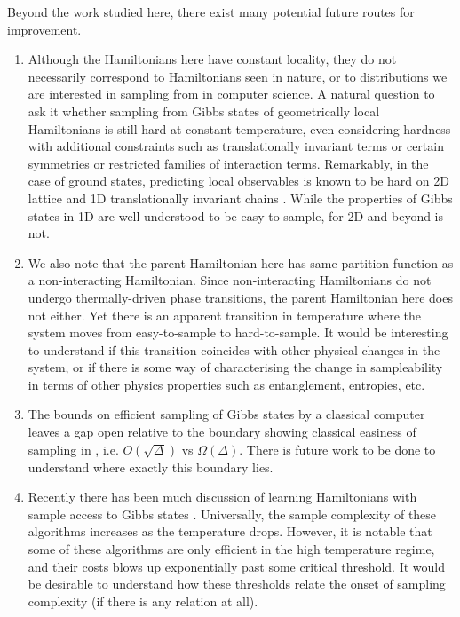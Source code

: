 \documentclass[a4paper,onecolumn,11pt,accepted=2017-05-09]{quantumarticle}
\begin{document}
Beyond the work studied here, there exist many potential future routes for improvement.
	\begin{enumerate}
 
	    \item 
	
	Although the Hamiltonians here have constant locality, they do not necessarily correspond to Hamiltonians seen in nature, or to distributions we are interested in sampling from in computer science. 
	A natural question to ask it whether sampling from Gibbs states of geometrically local Hamiltonians is still hard at constant temperature, even considering hardness with additional constraints such as translationally invariant terms or certain symmetries or restricted families of interaction terms.
	Remarkably, in the case of ground states, predicting local observables is known to be hard on 2D lattice and 1D translationally invariant chains \cite{gottesman2009quantum,gharibian2019oracle, watson2020complexity}.
    While the properties of Gibbs states in 1D are well understood to be easy-to-sample, for 2D and beyond is not.
	
	\item We also note that the parent Hamiltonian here has same partition function as a non-interacting Hamiltonian.
	Since non-interacting Hamiltonians do not undergo thermally-driven phase transitions, the parent Hamiltonian here does not either.
	Yet there is an apparent transition in temperature where the system moves from easy-to-sample to hard-to-sample.
	It would be interesting to understand if this transition coincides with other physical changes in the system, or if there is some way of characterising the change in sampleability in terms of other physics properties such as entanglement, entropies, etc.


    \item The bounds on efficient sampling of Gibbs states by a classical computer leaves a gap open relative to the boundary showing classical easiness of sampling in \citeauthor{bakshi2024high} \cite{bakshi2024high}, i.e. $O(\sqrt{\Delta})$ vs $\Omega(\Delta)$. 
    There is future work to be done to understand where exactly this boundary lies.

    \item Recently there has been much discussion of learning Hamiltonians with sample access to Gibbs states \cite{anshu2021sample, anshuweb, haah2022optimal, alhambra2023quantum, onorati2023efficient, rouze2024learning, garcia2024estimation, bakshi2024high}.
    Universally, the sample complexity of these algorithms increases as the temperature drops.
    However, it is notable that some of these algorithms are only efficient in the high temperature regime, and their costs blows up exponentially past some critical threshold.
    It would be desirable to understand how these thresholds relate the onset of sampling complexity (if there is any relation at all).


\end{enumerate}
\end{document}
